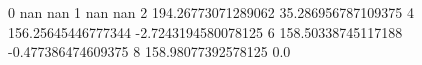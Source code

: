 0 nan nan
1 nan nan
2 194.26773071289062 35.286956787109375
4 156.25645446777344 -2.7243194580078125
6 158.50338745117188 -0.477386474609375
8 158.98077392578125 0.0
